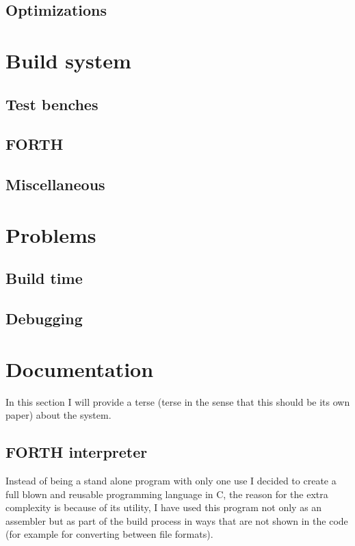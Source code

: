 \documentclass	[a4paper, 10pt]	{article}
\begin{document}
    \subsection{Optimizations}
  \section{Build system}
    \subsection{Test benches}
    \subsection{FORTH}
    \subsection{Miscellaneous}

  \section{Problems}
    \subsection{Build time}
    \subsection{Debugging}

  \section{Documentation}

  In this section I will provide a terse (terse in the sense that this should
  be its own paper) about the system.

    \subsection{FORTH interpreter}

    Instead of being a stand alone program with only one use I decided to create
    a full blown and reusable programming language in C, the reason for the extra
    complexity is because of its utility, I have used this program not only as an
    assembler but as part of the build process in ways that are not shown in the
    code (for example for converting between file formats).
\end{document}
